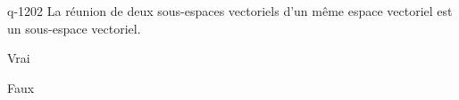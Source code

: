 \begin{truefalse}{q-1202}
La réunion de deux sous-espaces vectoriels d'un même espace vectoriel est un sous-espace vectoriel.
\item Vrai
\item* Faux
\end{truefalse}

